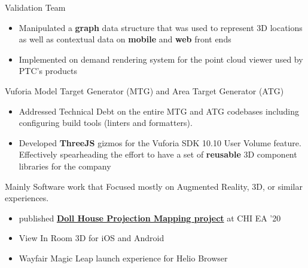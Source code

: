 \documentclass[]{plushcv}
\begin{document}
\begin{minipage}[t]{0.70\textwidth}
    \begin{tightemize}
        \sectionsep
        \item Validation Team
        \begin{itemize}
            \item Manipulated a \textbf{graph} data structure that was used to
                  represent 3D locations as well as contextual data
                  on \textbf{mobile} and \textbf{web} front ends
            \item Implemented on demand rendering system for the point cloud viewer used by PTC's products
        \end{itemize}
        \item Vuforia Model Target Generator (MTG) and Area Target Generator (ATG)
        \begin{itemize}
            \item Addressed Technical Debt on the entire MTG and ATG codebases including
                  configuring build tools (linters and formatters).
            \item Developed \textbf{ThreeJS} gizmos for the
                  Vuforia SDK 10.10 User Volume feature.
                  Effectively spearheading the effort to have a set of
                  \textbf{reusable} 3D component libraries for the company
        \end{itemize}
    \end{tightemize}
    \sectionsep

    \begin{tightemize}
        \sectionsep
        \item Mainly Software work that Focused mostly on Augmented Reality, 3D, or similar experiences.
        \begin{itemize}
            \item published \textbf{\href{https://dl.acm.org/doi/10.1145/3334480.3383180}{Doll House Projection Mapping project}} at CHI EA ’20
            \item View In Room 3D for iOS and Android
            \item Wayfair Magic Leap launch experience for Helio Browser
        \end{itemize}
    \end{tightemize}
    \sectionsep


\end{minipage}
\end{document}
